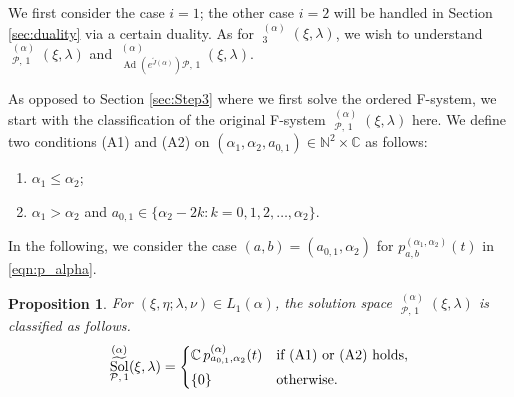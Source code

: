 \documentclass[a4paper,11pt,reqno]{amsart}
\newcommand{\CC}{\mathbb{C}}
\newcommand{\calP}{\mathcal{P}}
\newcommand{\0}{{\bf 0}}
\newcommand{\N}{\mathbb{N}}
\newcommand{\C}{\mathbb{C}}
\newcommand{\1}{{\bf 1}}
\DeclareMathOperator{\Ad}{Ad}
\DeclareMathOperator{\Sol}{Sol}
\newcommand{\wJ}{\widetilde{J}}
\DeclareMathOperator{\wSol}{\widetilde{\Sol}}
\theoremstyle{plain}
\newtheorem{proposition}[equation]{Proposition}
\theoremstyle{definition}
\numberwithin{equation}{section}
\theoremstyle{definition}
\begin{document}
We first consider the case $i=1$; the other case $i=2$ will be handled in 
Section \ref{sec:duality} via a certain duality.
As for $\wSol_3^{(\alpha)}(\xi,\lambda)$, 
we wish to understand
$\wSol_{\calP,\, 1}^{(\alpha)}(\xi,\lambda)$
and 
$\wSol_{\Ad(e^{\wJ(\alpha)}) \calP,\, 1}^{(\alpha)}(\xi,\lambda)$.

As opposed to Section \ref{sec:Step3} where we first solve the ordered F-system, we start with the classification of the original F-system
$\wSol_{\calP,\, 1}^{(\alpha)}(\xi,\lambda)$ here.
We define two conditions 
 (A1) and (A2) on $(\alpha_1, \alpha_2, a_{0,1}) \in \N^2 \times \C$ as follows:
\vspace{5pt}
\begin{enumerate}[label=\normalfont{(\arabic*)}]
\item[(A1)] $\alpha_1\leq \alpha_2$;
\vspace{5pt}
\item[(A2)] $\alpha_1>\alpha_2$ and 
$a_{0,1}\in \{\alpha_2 - 2k: k=0,1,2,\ldots, \alpha_2\}$.
\end{enumerate}
In the following,
we consider the case $(a,b)=(a_{0,1}, \alpha_2)$ for 
$p_{a,b}^{(\alpha_1, \alpha_2)}(t)$ in \eqref{eqn:p_alpha}.

\begin{proposition}\label{prop:SolD1}
For $(\xi, \eta; \lambda, \nu) \in L_1(\alpha)$,
the solution space $\wSol_{\calP,\, 1}^{(\alpha)}(\xi,\lambda)$ 
is classified as follows.
\begin{equation}\label{eqn:SolCay}
\wSol_{\calP,\, 1}^{(\alpha)}(\xi,\lambda)
=
\begin{cases}
\CC\,
p_{a_{0,1},\alpha_2}^{(\alpha)}(t) & 
\textnormal{if (A1) or (A2) holds,}\\[3pt]
\{0\} & \textnormal{otherwise.}
\end{cases}
\end{equation}
\end{proposition}
\end{document}
